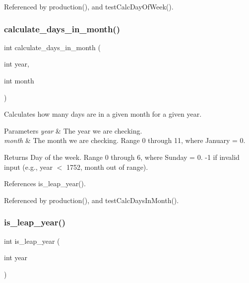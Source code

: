 Referenced by production(), and test\+Calc\+Day\+Of\+Week().

\mbox{\label{production_8h_a0b9793f3dff701e2a9903c8539328ad4}} 
\subsubsection{calculate\+\_\+days\+\_\+in\+\_\+month()}
{\footnotesize\ttfamily int calculate\+\_\+days\+\_\+in\+\_\+month (\begin{DoxyParamCaption}\item[{int}]{year,  }\item[{int}]{month }\end{DoxyParamCaption})}

Calculates how many days are in a given month for a given year. 
\begin{DoxyParams}{Parameters}
{\em year} & The year we are checking. \\
\hline
{\em month} & The month we are checking. Range 0 through 11, where January = 0. \\
\hline
\end{DoxyParams}
\begin{DoxyReturn}{Returns}
Day of the week. Range 0 through 6, where Sunday = 0. -\/1 if invalid input (e.\+g., year $<$ 1752, month out of range). 
\end{DoxyReturn}


References is\+\_\+leap\+\_\+year().



Referenced by production(), and test\+Calc\+Days\+In\+Month().

\mbox{\label{production_8h_a89b1fdc34c29bc50b397019f5e32f7af}} 
\subsubsection{is\+\_\+leap\+\_\+year()}
{\footnotesize\ttfamily int is\+\_\+leap\+\_\+year (\begin{DoxyParamCaption}\item[{int}]{year }\end{DoxyParamCaption})}

